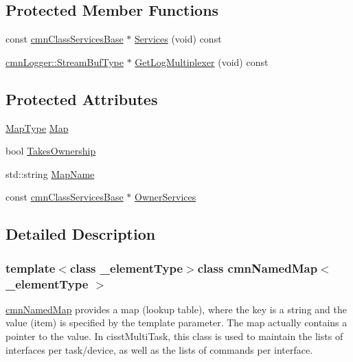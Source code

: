 \subsection*{Protected Member Functions}
{\bf }\par
\begin{DoxyCompactItemize}
\item 
const \hyperlink{classcmn_class_services_base}{cmn\-Class\-Services\-Base} $\ast$ \hyperlink{classcmn_named_map_ae27d833a5b4bb6fd27982d571a9479fa}{Services} (void) const 
\item 
\hyperlink{classcmn_logger_a7d192777882d1dc6bb48ceac0b4e65bb}{cmn\-Logger\-::\-Stream\-Buf\-Type} $\ast$ \hyperlink{classcmn_named_map_a1b154ee9ae3a3eaa748b867702f206d4}{Get\-Log\-Multiplexer} (void) const 
\end{DoxyCompactItemize}

\subsection*{Protected Attributes}
\begin{DoxyCompactItemize}
\item 
\hyperlink{classcmn_named_map_a35919ad9cccf3e060063b489db663425}{Map\-Type} \hyperlink{classcmn_named_map_aa5cb7ee747ba8ccc07557a5da5d48b19}{Map}
\item 
bool \hyperlink{classcmn_named_map_ad3775ffc68ea99a853f8eed94f1f1a4f}{Takes\-Ownership}
\item 
std\-::string \hyperlink{classcmn_named_map_a5dd1ca924e7481edf3e9c6f65c0f4b3d}{Map\-Name}
\item 
const \hyperlink{classcmn_class_services_base}{cmn\-Class\-Services\-Base} $\ast$ \hyperlink{classcmn_named_map_a8e6bffe8f1bdc710bacc3f1d38d75621}{Owner\-Services}
\end{DoxyCompactItemize}


\subsection{Detailed Description}
\subsubsection*{template$<$class \-\_\-element\-Type$>$class cmn\-Named\-Map$<$ \-\_\-element\-Type $>$}

\hyperlink{classcmn_named_map}{cmn\-Named\-Map} provides a map (lookup table), where the key is a string and the value (item) is specified by the template parameter. The map actually contains a pointer to the value. In cisst\-Multi\-Task, this class is used to maintain the lists of interfaces per task/device, as well as the lists of commands per interface.

